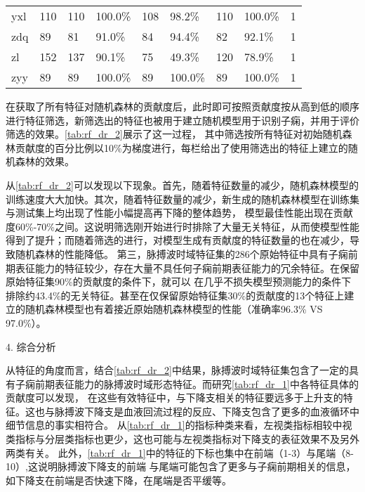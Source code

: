 \begin{landscape}
\begin{longtable}{m{2cm}<{\centering}m{2cm}<{\centering}m{2cm}<{\centering}m{2cm}<{\centering}m{2cm}<{\centering}m{2cm}<{\centering}m{2cm}<{\centering}m{2cm}<{\centering}m{2cm}<{\centering}}
            yxl                   & 110                   & 110        & 100.0\%    & 108        & 98.2\%     & 110        & 100.0\%     & 1                                                                      \\
            zdq                   & 89                    & 81         & 91.0\%     & 84         & 94.4\%     & 82         & 92.1\%      & 1                                                                      \\
            zl                    & 152                   & 137        & 90.1\%     & 75         & 49.3\%     & 120        & 78.9\%      & 1                                                                      \\
            zyy                   & 89                    & 89         & 100.0\%    & 89         & 100.0\%    & 89         & 100.0\%     & 1                                                                       \\    
      \end{longtable}
\end{landscape}

在获取了所有特征对随机森林的贡献度后，此时即可按照贡献度按从高到低的顺序进行特征筛选，新筛选出的特征也被用于建立随机模型用于识别子痫，并用于评价筛选的效果。\autoref{tab:rf_dr_2}展示了这一过程，
其中筛选按所有特征对初始随机森林贡献度的百分比例以10\%为梯度进行，每栏给出了使用筛选出的特征上建立的随机森林的效果。

从\autoref{tab:rf_dr_2}可以发现以下现象。首先，随着特征数量的减少，随机森林模型的训练速度大大加快。其次，随着特征数量的减少，新生成的随机森林模型在训练集与测试集上均出现了性能小幅提高再下降的整体趋势，
模型最佳性能出现在贡献度60\%-70\%之间。这说明筛选刚开始进行时排除了大量无关特征，从而使模型性能得到了提升；而随着筛选的进行，对模型生成有贡献度的特征数量的也在减少，导致随机森林的性能降低。
第三，脉搏波时域特征集的286个原始特征中具有子痫前期表征能力的特征较少，存在大量不具任何子痫前期表征能力的冗余特征。在保留原始特征集90\%的贡献度的条件下，就可以
在几乎不损失模型预测能力的条件下排除约43.4\%的无关特征。甚至在仅保留原始特征集30\%的贡献度的13个特征上建立的随机森林模型也有着接近原始随机森林模型的性能（准确率96.3\% VS 97.0\%）。

4. 综合分析

从特征的角度而言，结合\autoref{tab:rf_dr_2}中结果，脉搏波时域特征集包含了一定的具有子痫前期表征能力的脉搏波时域形态特征。而研究\autoref{tab:rf_dr_1}中各特征具体的贡献度可以发现，
在这些有效特征中，与下降支相关的特征要远多于上升支的特征。这也与脉搏波下降支是血液回流过程的反应、下降支包含了更多的血液循环中细节信息的事实相符合。
从\autoref{tab:rf_dr_1}的指标种类来看，左视类指标相较中视类指标与分层类指标也更少，这也可能与左视类指标对下降支的表征效果不及另外两类有关。
此外，\autoref{tab:rf_dr_1}中的特征的下标也集中在前端（1-3）与尾端（8-10）,这说明脉搏波下降支的前端
与尾端可能包含了更多与子痫前期相关的信息，如下降支在前端是否快速下降，在尾端是否平缓等。

